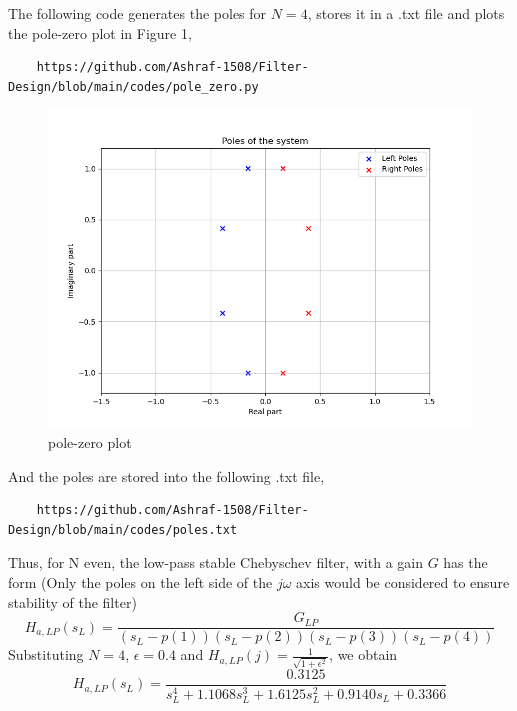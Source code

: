 \documentclass[journal,12pt,twocolumn]{IEEEtran}
\theoremstyle{remark}
\begin{document}
\begin{enumerate}
The following code generates the poles for $N=4$, stores it in a .txt file and plots the pole-zero plot in Figure 1,
\begin{lstlisting}
    https://github.com/Ashraf-1508/Filter-Design/blob/main/codes/pole_zero.py
\end{lstlisting}
\begin{figure}[h!]
    \centering
    \includegraphics[width=\columnwidth]{figs/pole-zero.png}
    \caption{pole-zero plot}
    \label{fig:p0}
\end{figure}
And the poles are stored into the following .txt file,
\begin{lstlisting}
    https://github.com/Ashraf-1508/Filter-Design/blob/main/codes/poles.txt
\end{lstlisting}

Thus, for N even, the low-pass stable Chebyschev filter, with a gain $G$ has the form (Only the poles on the left side of the $j\omega$ axis would be considered to ensure stability of the filter)
{\tiny{\begin{equation}
\label{poleleft}
H_{a,LP}(s_L) = \frac{G_{LP}}{(s_L-p(1))(s_L-p(2))(s_L-p(3))(s_L-p(4))}
\end{equation}}}
Substituting $N = 4$, $\epsilon = 0.4$ and $H_{a,LP}(j) = \frac{1}{\sqrt{1+\epsilon^2}}$, we obtain 
{\tiny{\begin{equation}
\label{lpfinal}
H_{a,LP}(s_L) = \frac{0.3125}{s_L^4 + 1.1068s_L^3 + 1.6125s_L^2+0.9140s_L + 0.3366}
\end{equation}}}


\end{enumerate}
\end{document}
